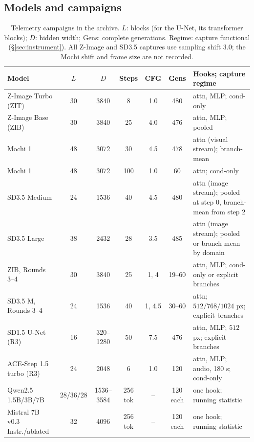 \documentclass[11pt]{article}
\begin{document}
\subsection{Models and campaigns}
\begin{table}[!t]
\centering
\small
\caption{Telemetry campaigns in the archive. $L$: blocks (for the U-Net, its transformer blocks); $D$: hidden width; Gens: complete generations. Regime: capture functional (\S\ref{sec:instrument}). All Z-Image and SD3.5 captures use sampling shift $3.0$; the Mochi shift and frame size are not recorded.}
\label{tab:corpus}
\begin{tabularx}{\linewidth}{lcccccL}
\toprule
Model & $L$ & $D$ & Steps & CFG & Gens & Hooks; capture regime\\
\midrule
Z-Image Turbo (ZIT) & 30 & 3840 & 8 & 1.0 & 480 & attn, MLP; cond-only\\
Z-Image Base (ZIB) & 30 & 3840 & 25 & 4.0 & 476 & attn, MLP; pooled\\
Mochi 1 & 48 & 3072 & 30 & 4.5 & 478 & attn (visual stream); branch-mean\\
Mochi 1 & 48 & 3072 & 100 & 1.0 & 60 & attn; cond-only\\
SD3.5 Medium & 24 & 1536 & 40 & 4.5 & 480 & attn (image stream); pooled at step 0, branch-mean from step 2\\
SD3.5 Large & 38 & 2432 & 28 & 3.5 & 485 & attn (image stream); pooled or branch-mean by domain\\
\midrule
ZIB, Rounds 3--4 & 30 & 3840 & 25 & 1, 4 & 19--60 & attn, MLP; cond-only or explicit branches\\
SD3.5 M, Rounds 3--4 & 24 & 1536 & 40 & 1, 4.5 & 30--60 & attn; $512/768/1024$ px; explicit branches\\
SD1.5 U-Net (R3) & 16 & 320--1280 & 50 & 7.5 & 476 & attn, MLP; $512$ px; explicit branches\\
ACE-Step 1.5 turbo (R3) & 24 & 2048 & 6 & 1.0 & 120 & attn, MLP; audio, 180 s; cond-only\\
\midrule
Qwen2.5 1.5B/3B/7B & 28/36/28 & 1536--3584 & 256 tok & -- & 120 each & one hook; running statistic\\
Mistral 7B v0.3 Instr./ablated & 32 & 4096 & 256 tok & -- & 120 each & one hook; running statistic\\
\bottomrule
\end{tabularx}
\end{table}
\end{document}
